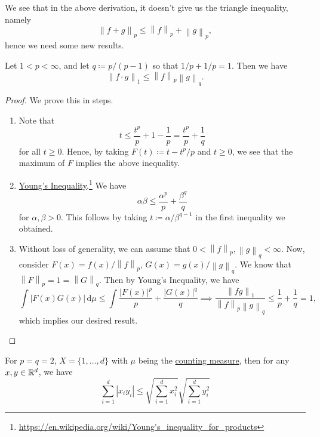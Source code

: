 We see that in the above derivation, it doesn't give us the triangle inequality, namely
\[
	\left\lVert f + g\right\rVert _p \leq  \left\lVert f\right\rVert _p + \left\lVert g\right\rVert _p,
\]
hence we need some new results.

\begin{theorem}\label{thm:Holder-inequality}
	Let \(1 < p < \infty \), and let \(q \coloneqq p / (p - 1)\) so that \(1 / p + 1 / p = 1\). Then we have
	\[
		\left\lVert f\cdot g\right\rVert _1 \leq  \left\lVert f\right\rVert _p \left\lVert g\right\rVert _q.
	\]
\end{theorem}
\begin{proof}
	We prove this in steps.
	\begin{enumerate}
		\item Note that
		      \[
			      t\leq \frac{t^p}{p}+1-\frac{1}{p} = \frac{t^p}{p}+ \frac{1}{q}
		      \]
		      for all \(t \geq 0\). Hence, by taking \(F(t) \coloneqq t - t^p / p\) and \(t \geq 0\), we see that the maximum of \(F\) implies the above inequality.
		\item \underline{Young's Inequality}.\footnote{\url{https://en.wikipedia.org/wiki/Young's_inequality_for_products}} We have
		      \[
			      \alpha \beta \leq \frac{\alpha ^p}{p} + \frac{\beta ^q}{q}
		      \]
		      for \(\alpha , \beta > 0\). This follows by taking \(t \coloneqq \alpha /\beta ^{q - 1}\) in the first inequality we obtained.
		\item Without loss of generality, we can assume that \(0 <\left\lVert f\right\rVert _p, \left\lVert g\right\rVert _q < \infty \). Now, consider \(F(x) = f(x) / \left\lVert f\right\rVert _p\),
		      \(G(x) = g(x) / \left\lVert g\right\rVert _q\). We know that \(\left\lVert F\right\rVert _p = 1 = \left\lVert G\right\rVert _q\). Then by Young's Inequality, we have
		      \[
			      \int \left\vert F(x)G(x) \right\vert \,\mathrm{d} \mu \leq \int \frac{\left\vert F(x) \right\vert ^p}{p} + \frac{\left\vert G(x) \right\vert ^q}{q} \implies \frac{\left\lVert fg\right\rVert _1}{\left\lVert f\right\rVert _p \left\lVert g\right\rVert _q}\leq \frac{1}{p} + \frac{1}{q} = 1,
		      \]
		      which implies our desired result.
	\end{enumerate}
\end{proof}
\begin{eg}
	For \(p = q = 2\), \(X = \{1, \ldots , d \}\) with \(\mu \) being the \hyperref[eg:counting-measure]{counting measure}, then for any \(x, y\in \mathbb{\MakeUppercase{r}} ^d\), we have
	\[
		\sum\limits_{i=1}^{d} \left\vert x_{i} y_{i}  \right\vert \leq \sqrt{\sum\limits_{i=1}^{d} x_{i} ^{2} } \sqrt{\sum\limits_{i=1}^{d} y_{i} ^{2} }
	\]
\end{eg}

